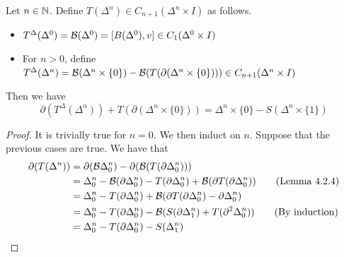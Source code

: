\documentclass[a4paper]{article}
\begin{document}
\begin{prp}{}{} Let $n\in\mathbb{N}$. Define $T(\Delta^n)\in C_{n+1}(\Delta^n\times I)$ as follows. 
\begin{itemize}
\item $T^\Delta(\Delta^0)=\mathcal{B}(\Delta^0)=[B(\Delta^0),v]\in C_1(\Delta^0\times I)$
\item For $n>0$, define $T^\Delta(\Delta^n)=\mathcal{B}(\Delta^n\times\{0\})-\mathcal{B}(T(\partial(\Delta^n\times\{0\})))\in C_{n+1}(\Delta^n\times I)$
\end{itemize}
Then we have $$\partial(T^\Delta(\Delta^n))+T(\partial(\Delta^n\times\{0\}))=\Delta^n\times\{0\}-S(\Delta^n\times\{1\})$$ \tcbline
\begin{proof}
It is trivially true for $n=0$. We then induct on $n$. Suppose that the previous cases are true. We have that 
\begin{align*}
\partial(T(\Delta^n))&=\partial(\mathcal{B}\Delta_0^n)-\partial(\mathcal{B}(T(\partial\Delta_0^n)))\\
&=\Delta_0^n-\mathcal{B}(\partial\Delta_0^n)-T(\partial\Delta_0^n)+\mathcal{B}(\partial T(\partial\Delta_0^n))\tag{Lemma 4.2.4}\\
&=\Delta_0^n-T(\partial\Delta_0^n)+\mathcal{B}(\partial T(\partial\Delta_0^n)-\partial\Delta_0^n)\\
&=\Delta_0^n-T(\partial\Delta_0^n)-\mathcal{B}(S(\partial\Delta_1^n)+T(\partial^2\Delta_0^n))\tag{By induction}\\
&=\Delta_0^n-T(\partial\Delta_0^n)-S(\Delta_1^n)
\end{align*}
\end{proof}
\end{prp}
\end{document}
